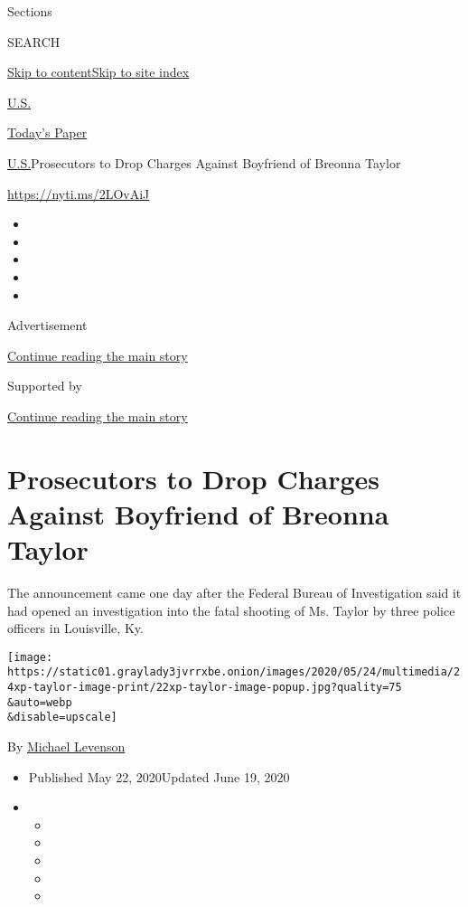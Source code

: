 Sections

SEARCH

\protect\hyperlink{site-content}{Skip to
content}\protect\hyperlink{site-index}{Skip to site index}

\href{https://www.nytimes3xbfgragh.onion/section/us}{U.S.}

\href{https://myaccount.nytimes3xbfgragh.onion/auth/login?response_type=cookie\&client_id=vi}{}

\href{https://www.nytimes3xbfgragh.onion/section/todayspaper}{Today's
Paper}

\href{/section/us}{U.S.}\textbar{}Prosecutors to Drop Charges Against
Boyfriend of Breonna Taylor

\url{https://nyti.ms/2LOvAiJ}

\begin{itemize}
\item
\item
\item
\item
\item
\end{itemize}

Advertisement

\protect\hyperlink{after-top}{Continue reading the main story}

Supported by

\protect\hyperlink{after-sponsor}{Continue reading the main story}

\hypertarget{prosecutors-to-drop-charges-against-boyfriend-of-breonna-taylor}{%
\section{Prosecutors to Drop Charges Against Boyfriend of Breonna
Taylor}\label{prosecutors-to-drop-charges-against-boyfriend-of-breonna-taylor}}

The announcement came one day after the Federal Bureau of Investigation
said it had opened an investigation into the fatal shooting of Ms.
Taylor by three police officers in Louisville, Ky.

\texttt{[image: https://static01.graylady3jvrrxbe.onion/images/2020/05/24/multimedia/24xp-taylor-image-print/22xp-taylor-image-popup.jpg?quality=75\\\&auto=webp\\\&disable=upscale]}

By \href{https://www.nytimes3xbfgragh.onion/by/michael-levenson}{Michael
Levenson}

\begin{itemize}
\item
  Published May 22, 2020Updated June 19, 2020
\item
  \begin{itemize}
  \item
  \item
  \item
  \item
  \item
  \end{itemize}
\end{itemize}

